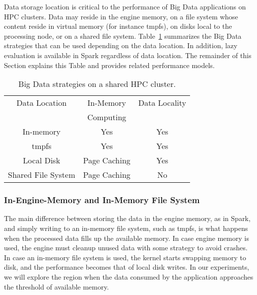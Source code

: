 \documentclass{IEEEtran}
\begin{document}
Data storage location is critical to the performance of Big Data 
applications on HPC clusters.
Data may reside in the engine memory, on 
a file system whose content reside in virtual memory (for instance 
tmpfs), on disks local to the processing node, or on a shared 
file system. Table~\ref{table:features} summarizes the Big Data 
strategies that can be used depending on the data location. In 
addition, lazy evaluation is available in Spark regardless of data 
location. The remainder of this Section explains this Table and 
provides related performance models.
\begin{table}
\centering
\begin{tabular}{c|cc}
   \rowcolor{headcolor}
    Data Location                 & In-Memory     & Data Locality        \\
    \rowcolor{headcolor}
                                  & Computing     &                     \\
                                  \hline          
In-memory                         & \cellcolor{green!25} Yes           & \cellcolor{green!25}Yes                      \\
tmpfs                             & \cellcolor{green!25} Yes           & \cellcolor{green!25}Yes                  \\
Local Disk                        & \cellcolor{orange!25}Page Caching  & \cellcolor{green!25}Yes                  \\
Shared File System                & \cellcolor{orange!25}Page Caching  & \cellcolor{red!25}No                
\end{tabular}
\caption{Big Data strategies on a shared HPC cluster.}
\label{table:features}
\end{table}

\subsubsection{In-Engine-Memory and In-Memory File System} 

 The main difference between storing the data in the engine memory, as in Spark, 
 and simply writing to an in-memory file system, such as tmpfs, is 
 what happens when the processed data fills up the available 
 memory. In case engine memory is used, the engine must cleanup 
 unused data with some strategy to avoid crashes. In case an in-memory 
 file system is used, the kernel starts swapping memory to disk, and 
 the performance becomes that of local disk writes. In our experiments, 
 we will explore the region  when the data consumed by the 
 application approaches the threshold of available memory.
\end{document}
